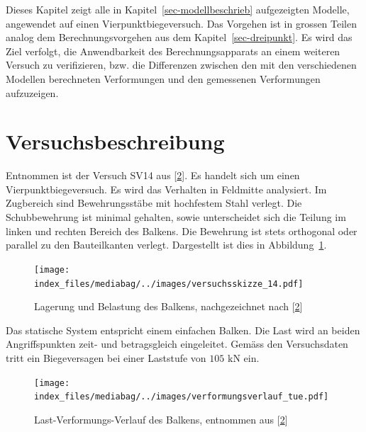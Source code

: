 \documentclass[
  12pt,
  letterpaper,
  egregdoesnotlikesansseriftitles]{scrreprt}
\begin{document}
Dieses Kapitel zeigt alle in Kapitel~\ref{sec-modellbeschrieb}
aufgezeigten Modelle, angewendet auf einen Vierpunktbiegeversuch. Das
Vorgehen ist in grossen Teilen analog dem Berechnungsvorgehen aus dem
Kapitel~\ref{sec-dreipunkt}. Es wird das Ziel verfolgt, die
Anwendbarkeit des Berechnungsapparats an einem weiteren Versuch zu
verifizieren, bzw. die Differenzen zwischen den mit den verschiedenen
Modellen berechneten Verformungen und den gemessenen Verformungen
aufzuzeigen.

\hypertarget{versuchsbeschreibung-1}{%
\section{Versuchsbeschreibung}\label{versuchsbeschreibung-1}}

Entnommen ist der Versuch SV14 aus
{[}\protect\hyperlink{ref-Tue2019}{2}{]}. Es handelt sich um einen
Vierpunktbiegeversuch. Es wird das Verhalten in Feldmitte analysiert. Im
Zugbereich sind Bewehrungsstäbe mit hochfestem Stahl verlegt. Die
Schubbewehrung ist minimal gehalten, sowie unterscheidet sich die
Teilung im linken und rechten Bereich des Balkens. Die Bewehrung ist
stets orthogonal oder parallel zu den Bauteilkanten verlegt. Dargestellt
ist dies in Abbildung~\ref{fig-system_sv14}.

\begin{figure}[H]

{\centering \texttt{[image: index\_files/mediabag/../images/versuchsskizze\_14.pdf]}

}

\caption{\label{fig-system_sv14}Lagerung und Belastung des Balkens,
nachgezeichnet nach {[}\protect\hyperlink{ref-Tue2019}{2}{]}}

\end{figure}

Das statische System entspricht einem einfachen Balken. Die Last wird an
beiden Angriffspunkten zeit- und betragsgleich eingeleitet. Gemäss den
Versuchsdaten tritt ein Biegeversagen bei einer Laststufe von
\(105 \text{ kN}\) ein.

\begin{figure}[H]

{\centering \texttt{[image: index\_files/mediabag/../images/verformungsverlauf\_tue.pdf]}

}

\caption{\label{fig-last_verformung_sv14}Last-Verformungs-Verlauf des
Balkens, entnommen aus {[}\protect\hyperlink{ref-Tue2019}{2}{]}}

\end{figure}
\end{document}
